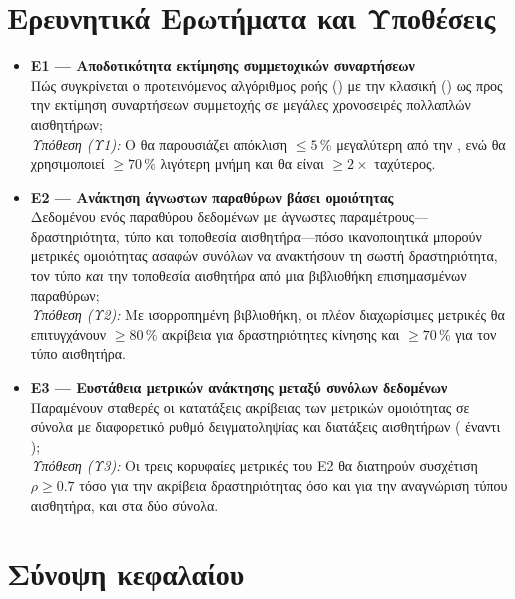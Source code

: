 \section{Ερευνητικά Ερωτήματα και Υποθέσεις}
\label{sec:rq-hypo}
\begin{itemize}
    \item \textbf{Ε1 — Αποδοτικότητα εκτίμησης συμμετοχικών συναρτήσεων}\\
    Πώς συγκρίνεται ο προτεινόμενος αλγόριθμος ροής  () με την κλασική  () ως προς την εκτίμηση συναρτήσεων συμμετοχής σε μεγάλες χρονοσειρές πολλαπλών αισθητήρων;\\
    \textit{Υπόθεση (Υ1):} Ο  θα παρουσιάζει απόκλιση  \(\leq 5\,\%\) μεγαλύτερη από την , ενώ θα χρησιμοποιεί \(\geq 70\,\%\) λιγότερη μνήμη  και θα είναι \(\geq 2\times\) ταχύτερος.

    \item \textbf{Ε2 — Ανάκτηση άγνωστων παραθύρων βάσει ομοιότητας}\\
    Δεδομένου ενός παραθύρου δεδομένων με άγνωστες παραμέτρους—δραστηριότητα, τύπο και τοποθεσία αισθητήρα—πόσο ικανοποιητικά μπορούν μετρικές ομοιότητας ασαφών συνόλων να ανακτήσουν τη σωστή δραστηριότητα, τον τύπο \emph{και} την τοποθεσία αισθητήρα από μια βιβλιοθήκη επισημασμένων παραθύρων;\\
    \textit{Υπόθεση (Υ2):} Με ισορροπημένη βιβλιοθήκη, οι πλέον διαχωρίσιμες μετρικές θα επιτυγχάνουν \(\geq 80\,\%\) ακρίβεια  για δραστηριότητες κίνησης και \(\geq 70\,\%\) για τον τύπο αισθητήρα.

    \item \textbf{Ε3 — Ευστάθεια μετρικών ανάκτησης μεταξύ συνόλων δεδομένων}\\
    Παραμένουν σταθερές οι κατατάξεις ακρίβειας των μετρικών ομοιότητας σε σύνολα με διαφορετικό ρυθμό δειγματοληψίας και διατάξεις αισθητήρων ( έναντι );\\
    \textit{Υπόθεση (Υ3):} Οι τρεις κορυφαίες μετρικές του Ε2 θα διατηρούν συσχέτιση  \(\rho \geq 0.7\) τόσο για την ακρίβεια δραστηριότητας όσο και για την αναγνώριση τύπου αισθητήρα, και στα δύο σύνολα.
\end{itemize}
\section{Σύνοψη κεφαλαίου}
